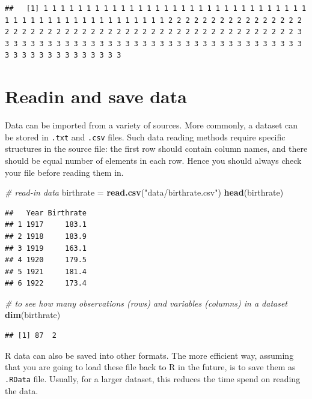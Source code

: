 \documentclass[
]{book}
\newenvironment{Shaded}{\begin{snugshade}}{\end{snugshade}}
\newcommand{\CommentTok}[1]{\textcolor[rgb]{0.56,0.35,0.01}{\textit{#1}}}
\newcommand{\KeywordTok}[1]{\textcolor[rgb]{0.13,0.29,0.53}{\textbf{#1}}}
\newcommand{\NormalTok}[1]{#1}
\newcommand{\StringTok}[1]{\textcolor[rgb]{0.31,0.60,0.02}{#1}}
\begin{document}
\begin{verbatim}
##   [1] 1 1 1 1 1 1 1 1 1 1 1 1 1 1 1 1 1 1 1 1 1 1 1 1 1 1 1 1 1 1 1 1 1 1 1 1 1 1 1 1 1 1 1 1 1 1 1 1 1 1 2 2 2 2 2 2 2 2 2 2 2 2 2 2 2 2 2 2 2 2 2 2 2 2 2 2 2 2 2 2 2 2 2 2 2 2 2 2 2 2 2 2 2 2 2 2 2 2 2 2 3 3 3 3 3 3 3 3 3 3 3 3 3 3 3 3 3 3 3 3 3 3 3 3 3 3 3 3 3 3 3 3 3 3 3 3 3 3 3 3 3 3 3 3 3 3 3 3 3 3
\end{verbatim}

\hypertarget{readin-and-save-data}{%
\section{Readin and save data}\label{readin-and-save-data}}

Data can be imported from a variety of sources. More commonly, a dataset can be stored in \texttt{.txt} and \texttt{.csv} files. Such data reading methods require specific structures in the source file: the first row should contain column names, and there should be equal number of elements in each row. Hence you should always check your file before reading them in.

\begin{Shaded}
\begin{Highlighting}[]
  \CommentTok{# read-in data}
\NormalTok{  birthrate =}\StringTok{ }\KeywordTok{read.csv}\NormalTok{(}\StringTok{"data/birthrate.csv"}\NormalTok{)}
  \KeywordTok{head}\NormalTok{(birthrate)}
\end{Highlighting}
\end{Shaded}

\begin{verbatim}
##   Year Birthrate
## 1 1917     183.1
## 2 1918     183.9
## 3 1919     163.1
## 4 1920     179.5
## 5 1921     181.4
## 6 1922     173.4
\end{verbatim}

\begin{Shaded}
\begin{Highlighting}[]
  \CommentTok{# to see how many observations (rows) and variables (columns) in a dataset}
  \KeywordTok{dim}\NormalTok{(birthrate)}
\end{Highlighting}
\end{Shaded}

\begin{verbatim}
## [1] 87  2
\end{verbatim}

R data can also be saved into other formats. The more efficient way, assuming that you are going to load these file back to R in the future, is to save them as \texttt{.RData} file. Usually, for a larger dataset, this reduces the time spend on reading the data.
\end{document}
